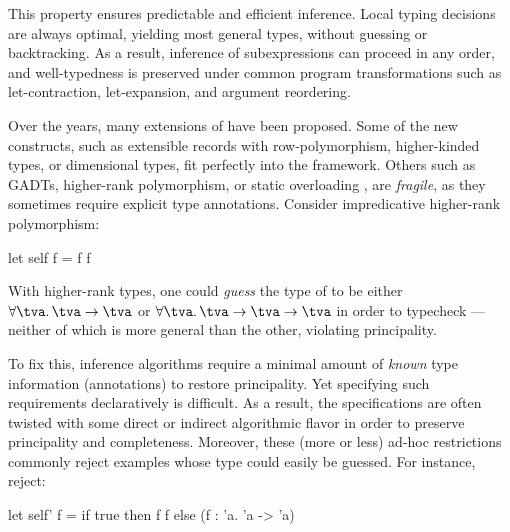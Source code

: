 \documentclass[acmsmall,screen,nonacm]{acmart}
\begin{document}
This property ensures predictable and efficient inference. Local typing
decisions are always optimal, yielding most general types, without guessing or
backtracking. As a result, inference of subexpressions can proceed in any
order, and well-typedness is preserved under common program transformations
such as let-contraction, let-expansion, and argument reordering.

Over the years, many extensions of \ML have been proposed. Some of the new
constructs, such as extensible records with row-polymorphism, higher-kinded
types, or dimensional types, fit perfectly into the \ML framework. Others such
as GADTs, higher-rank polymorphism, or static overloading
, are \emph{fragile}, as they sometimes require explicit type
annotations.
%
Consider impredicative higher-rank polymorphism:
\begin{program}[input]
  let self f = f f
\end{program}
With higher-rank types, one could \emph{guess} the type of  to be
either $\tfor \tv \tv \to \tv$ or $\tfor  \tv \tv \to \tv \to \tv$ in order to
typecheck ---neither of which is more general than the other,
violating principality.


To fix this, inference algorithms require a minimal amount of \emph{known}
type information (\ie annotations) to restore principality. Yet specifying
such requirements declaratively is difficult. As a result, the specifications
are often twisted with some direct or indirect algorithmic flavor in order to
preserve principality and completeness.
%
Moreover, these (more or less) ad-hoc restrictions commonly reject examples
whose type could easily be guessed. For instance, \citep{TODO} reject:
\begin{program}[input]
  let self' f = if true then f f else (f : 'a. 'a -> 'a)
\end{program}

\end{document}
